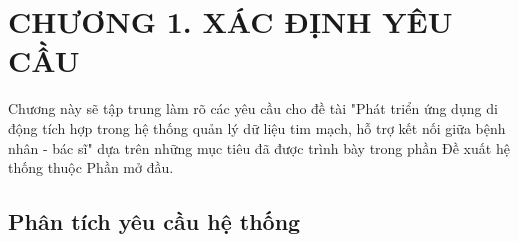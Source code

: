 
\section*{CHƯƠNG 1. XÁC ĐỊNH YÊU CẦU}
\setcounter{section}{1}
\setcounter{subsection}{0} %
\setcounter{table}{0} %
\setcounter{figure}{0} %
Chương này sẽ tập trung làm rõ các yêu cầu cho đề tài "Phát triển ứng dụng di động tích hợp trong hệ thống quản lý dữ liệu tim
mạch, hỗ trợ kết nối giữa bệnh nhân - bác sĩ" dựa trên những mục tiêu đã được trình bày trong phần Đề xuất hệ thống thuộc Phần mở đầu.

\subsection{Phân tích yêu cầu hệ thống}
